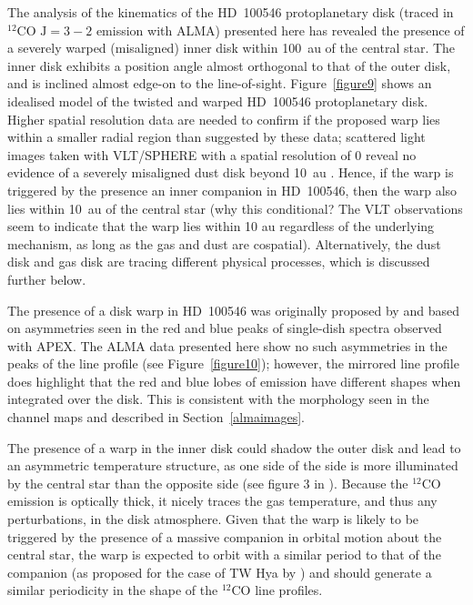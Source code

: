 \documentclass[onecolumn]{aastex6}
\begin{document}
The analysis of the kinematics of the HD~100546 protoplanetary disk (traced in
$^{12}$CO $\mathrm{J}=3-2$ emission with ALMA) presented here has revealed the
presence of a severely warped (misaligned) inner disk within 100~au of the
central star. The inner disk exhibits a position angle almost orthogonal to that
of the outer disk, and is inclined almost edge-on to the line-of-sight.
Figure~\ref{figure9} shows an idealised model of the twisted and warped
HD~100546 protoplanetary disk. Higher spatial resolution data are needed to
confirm if the proposed warp lies within a smaller radial region than suggested
by these data; scattered light images taken with VLT/SPHERE with a spatial
resolution of 0 reveal no evidence of a severely misaligned dust disk
beyond 10~au \citep{garufi16}. Hence, if the warp is triggered by the presence
an inner companion in HD~100546, then the warp also lies within 10~au of the
central star (why this conditional? The VLT observations seem to indicate that
the warp lies within 10 au regardless of the underlying mechanism, as long as
the gas and dust are cospatial). Alternatively, the dust disk and gas disk are
tracing different physical processes, which is discussed further below.

The presence of a disk warp in HD~100546 was originally proposed by
\citep{panic10} and based on asymmetries seen in the red and blue peaks of
single-dish spectra observed with APEX. The ALMA data presented here show no
such asymmetries in the peaks of the line profile (see Figure~\ref{figure10});
however, the mirrored line profile does highlight that the red and blue lobes of
emission have different shapes when integrated over the disk. This is consistent
with the morphology seen in the channel maps and described in
Section~\ref{almaimages}.



The presence of a warp in the inner disk could shadow the outer disk and lead to
an asymmetric temperature structure, as one side of the side is more illuminated
by the central star than the opposite side (see figure 3 in \citealt{panic10}).
Because the $^{12}$CO emission is optically thick, it nicely traces the gas
temperature, and thus any perturbations, in the disk atmosphere. Given that the
warp is likely to be triggered by the presence of a massive companion in orbital
motion about the central star, the warp is expected to orbit with a similar
period to that of the companion (as proposed for the case of TW Hya by
\citealt{debes17}) and should generate a similar periodicity in the shape of the
$^{12}$CO line profiles.
\end{document}
